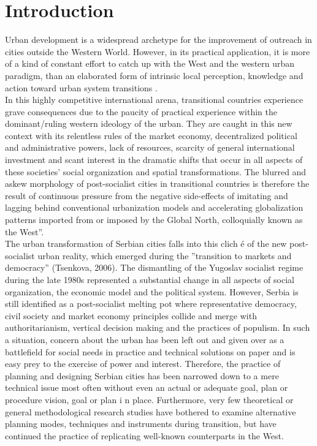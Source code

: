 \documentclass[11pt]{report}
\begin{document}

\chapter{Introduction}

Urban development is a widespread archetype for the improvement of outreach in cities outside the Western World. However, in its practical application, it is more of a kind of constant effort to catch up with the West and the western urban paradigm, than an elaborated form of intrinsic local perception, knowledge and action toward urban system transitions . 
\\
In this highly competitive international arena, transitional countries experience grave consequences due to the paucity of practical experience within the dominant/ruling western ideology of the urban. They are caught in this new context with its relentless rules of the market economy, decentralized political and administrative powers, lack of resources, scarcity of general international investment and scant interest in the dramatic shifts that occur in all aspects of these societies’ social organization and spatial transformations. The blurred and askew morphology of post-socialist cities in transitional countries is therefore the result of continuous pressure from the negative side-effects of imitating and lagging behind conventional urbanization models and accelerating globalization patterns imported from or imposed by the Global North, colloquially  known as  the West”.
\\
The urban transformation of Serbian cities falls into this clich é of the new post-socialist urban reality, which emerged during the ”transition to markets and democracy” (Tsenkova, 2006).  The dismantling of the Yugoslav socialist regime during the late 1980s represented a substantial change in all aspects of social organization, the economic model and the political system. However, Serbia is still identified as a post-socialist melting pot where representative democracy, civil society and market economy principles collide and merge with authoritarianism, vertical decision making and the practices of populism. In such a situation, concern about the urban has been left out and given over as a battlefield for social needs in practice and technical solutions on paper and is easy prey to the exercise of power and interest. Therefore, the practice of planning and designing Serbian cities has been narrowed down to a mere technical issue most often without even an actual or adequate goal, plan or procedure vision, goal or plan  i n place. Furthermore, very few theoretical or general methodological research studies have bothered to examine alternative planning modes, techniques and instruments during transition, but have continued the practice of replicating  well-known counterparts in the West.
\end{document}
